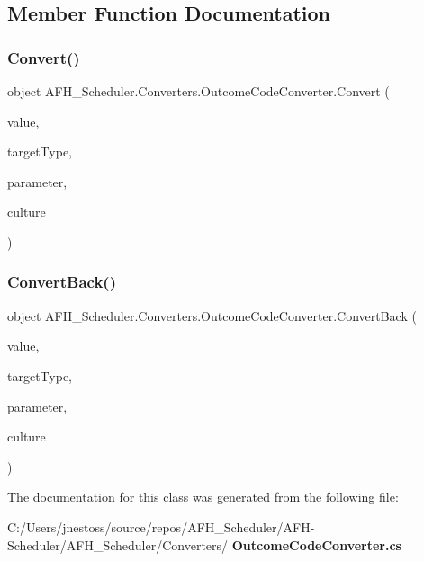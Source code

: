\subsection{Member Function Documentation}
\mbox{\label{class_a_f_h___scheduler_1_1_converters_1_1_outcome_code_converter_ab28938bfbb2edeb5e5f8438b60ff04e9}} 
\subsubsection{Convert()}
{\footnotesize\ttfamily object A\+F\+H\+\_\+\+Scheduler.\+Converters.\+Outcome\+Code\+Converter.\+Convert (\begin{DoxyParamCaption}\item[{object}]{value,  }\item[{Type}]{target\+Type,  }\item[{object}]{parameter,  }\item[{Culture\+Info}]{culture }\end{DoxyParamCaption})}

\mbox{\label{class_a_f_h___scheduler_1_1_converters_1_1_outcome_code_converter_ac28a60e5ec81eb0bcc3f4bb56401fa46}} 
\subsubsection{ConvertBack()}
{\footnotesize\ttfamily object A\+F\+H\+\_\+\+Scheduler.\+Converters.\+Outcome\+Code\+Converter.\+Convert\+Back (\begin{DoxyParamCaption}\item[{object}]{value,  }\item[{Type}]{target\+Type,  }\item[{object}]{parameter,  }\item[{Culture\+Info}]{culture }\end{DoxyParamCaption})}



The documentation for this class was generated from the following file\+:\begin{DoxyCompactItemize}
\item 
C\+:/\+Users/jnestoss/source/repos/\+A\+F\+H\+\_\+\+Scheduler/\+A\+F\+H-\/\+Scheduler/\+A\+F\+H\+\_\+\+Scheduler/\+Converters/\textbf{ Outcome\+Code\+Converter.\+cs}\end{DoxyCompactItemize}
